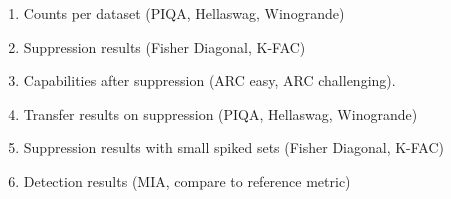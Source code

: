 \begin{enumerate}
    \item Counts per dataset (PIQA, Hellaswag, Winogrande)
    \item Suppression results (Fisher Diagonal, K-FAC)
    \item Capabilities after suppression (ARC easy, ARC challenging).
    \item Transfer results on suppression (PIQA, Hellaswag, Winogrande)
    \item Suppression results with small spiked sets (Fisher Diagonal, K-FAC)
    \item Detection results (MIA, compare to reference metric)
\end{enumerate}


